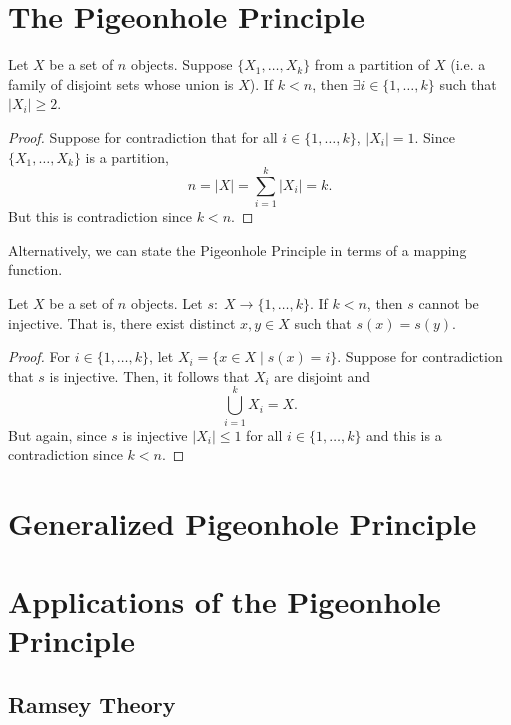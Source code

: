 \section{The Pigeonhole Principle}

\begin{theorem}
    Let $X$ be a set of $n$ objects. Suppose $\{X_1,\ldots,X_k\}$ from a partition of $X$ (i.e. a family of disjoint sets whose union is $X$). If $k < n$, then $\exists i \in \{1,\ldots,k\}$ such that $|X_i| \geq 2$.
\end{theorem}

\begin{proof}
    Suppose for contradiction that for all $i \in \{1,\ldots,k\}$, $|X_i| = 1$. Since $\{X_1,\ldots,X_k\}$ is a partition, 
    $$
    n = |X| = \sum_{i=1}^k |X_i| = k.
    $$
    But this is contradiction since $k < n$.
\end{proof}

Alternatively, we can state the Pigeonhole Principle in terms of a mapping function.

\begin{theorem}
    Let $X$ be a set of $n$ objects. Let $s:\; X \to \{1,\ldots,k\}$. If $k < n$, then $s$ cannot be injective. That is, there exist distinct $x,y \in X$ such that $s(x) = s(y)$.
\end{theorem}

\begin{proof}
    For $i \in \{1,\ldots,k\}$, let $X_i = \{x \in X \mid s(x) = i\}$. Suppose for contradiction that $s$ is injective. Then, it follows that $X_i$ are disjoint and 
    $$
    \bigcup_{i=1}^k X_i = X.
    $$
    But again, since $s$ is injective $|X_i| \leq 1$ for all $i \in \{1,\ldots,k\}$ and this is a contradiction since $k < n$.
\end{proof}

\section{Generalized Pigeonhole Principle}

\section{Applications of the Pigeonhole Principle}

\subsection{Ramsey Theory}